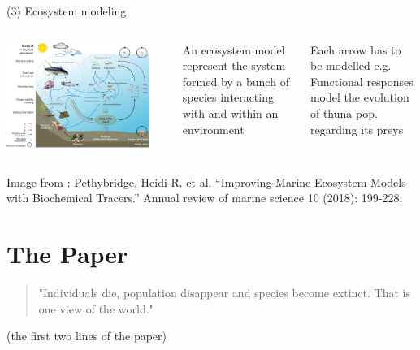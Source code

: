 \documentclass[11,aspectratio=1610]{beamer}
\begin{document}
\begin{frame}{(3) Ecosystem modeling }


\begin{columns}
\includegraphics[width=0.9\textwidth]{img/ecosystem_model.png}
\scriptsize{
An \alert{ecosystem model} represent the system formed by a bunch of species interacting with and within an environment


\vspace{0.5cm}
  \alert{Each arrow}  has to be modelled  e.g. Functional responses  model the evolution of thuna pop. regarding its preys
}
\end{columns}



\vfill
\tiny{Image from :  Pethybridge, Heidi R. et al. “Improving Marine Ecosystem Models with Biochemical Tracers.” Annual review of marine science 10 (2018): 199-228.}

\end{frame}





\section{The Paper}

\begin{frame}[standout]

\begin{quote}
"Individuals die, population disappear and species become extinct. That is one view of the world."
\end{quote}
\flushright
\tiny{(the first two lines of the paper)}
  
\end{frame}
\end{document}
